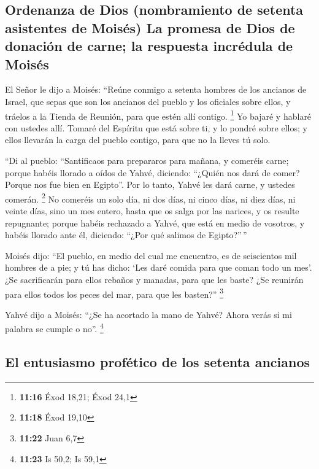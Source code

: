 \hypertarget{ordenanza-de-dios-nombramiento-de-setenta-asistentes-de-moisuxe9s-la-promesa-de-dios-de-donaciuxf3n-de-carne-la-respuesta-incruxe9dula-de-moisuxe9s}{%
\subsection{Ordenanza de Dios (nombramiento de setenta asistentes de
Moisés) La promesa de Dios de donación de carne; la respuesta incrédula
de
Moisés}\label{ordenanza-de-dios-nombramiento-de-setenta-asistentes-de-moisuxe9s-la-promesa-de-dios-de-donaciuxf3n-de-carne-la-respuesta-incruxe9dula-de-moisuxe9s}}

 El Señor le dijo a Moisés: ``Reúne conmigo a setenta
hombres de los ancianos de Israel, que sepas que son los ancianos del
pueblo y los oficiales sobre ellos, y tráelos a la Tienda de Reunión,
para que estén allí contigo. \footnote{\textbf{11:16} Éxod 18,21; Éxod
  24,1}  Yo bajaré y hablaré con ustedes allí. Tomaré del
Espíritu que está sobre ti, y lo pondré sobre ellos; y ellos llevarán la
carga del pueblo contigo, para que no la lleves tú solo.

 ``Di al pueblo: ``Santificaos para prepararos para
mañana, y comeréis carne; porque habéis llorado a oídos de Yahvé,
diciendo: ``¿Quién nos dará de comer? Porque nos fue bien en Egipto''.
Por lo tanto, Yahvé les dará carne, y ustedes comerán. \footnote{\textbf{11:18}
  Éxod 19,10}  No comeréis un solo día, ni dos días, ni
cinco días, ni diez días, ni veinte días,  sino un mes
entero, hasta que os salga por las narices, y os resulte repugnante;
porque habéis rechazado a Yahvé, que está en medio de vosotros, y habéis
llorado ante él, diciendo: ``¿Por qué salimos de Egipto?''\,''

 Moisés dijo: ``El pueblo, en medio del cual me
encuentro, es de seiscientos mil hombres de a pie; y tú has dicho: `Les
daré comida para que coman todo un mes'.  ¿Se
sacrificarán para ellos rebaños y manadas, para que les baste? ¿Se
reunirán para ellos todos los peces del mar, para que les basten?''
\footnote{\textbf{11:22} Juan 6,7}

 Yahvé dijo a Moisés: ``¿Se ha acortado la mano de Yahvé?
Ahora verás si mi palabra se cumple o no''. \footnote{\textbf{11:23} Is
  50,2; Is 59,1}

\hypertarget{el-entusiasmo-profuxe9tico-de-los-setenta-ancianos}{%
\subsection{El entusiasmo profético de los setenta
ancianos}\label{el-entusiasmo-profuxe9tico-de-los-setenta-ancianos}}

